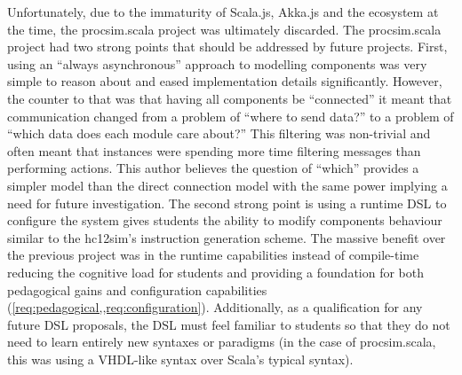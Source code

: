 Unfortunately, due to the immaturity of Scala.js, Akka.js and the ecosystem at the time, the procsim.scala project was ultimately discarded. The procsim.scala project had two strong points that should be addressed by future projects. First, using an ``always asynchronous'' approach to modelling components was very simple to reason about and eased implementation details significantly. However, the counter to that was that having all components be ``connected'' it meant that communication changed from a problem of ``where to send data?'' to a problem of ``which data does each module care about?'' This filtering was non-trivial and often meant that \akkaActor{} instances were spending more time filtering messages than performing actions. This author believes the question of ``which'' provides a simpler model than the direct connection model with the same power implying a need for future investigation. The second strong point is using a runtime DSL to configure the system gives students the ability to modify components behaviour similar to the hc12sim's instruction generation scheme. The massive benefit over the previous project was in the runtime capabilities instead of compile-time reducing the cognitive load for students and providing a foundation for both pedagogical gains and configuration capabilities (\cref{req:pedagogical,,req:configuration}). Additionally, as a qualification for any future DSL proposals, the DSL must feel familiar to students so that they do not need to learn entirely new syntaxes or paradigms (in the case of procsim.scala, this was using a VHDL-like syntax over Scala's typical syntax). 

